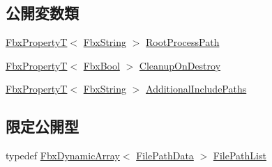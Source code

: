\subsection*{公開変数類}
\begin{DoxyCompactItemize}
\item 
\hyperlink{class_fbx_property_t}{Fbx\+PropertyT}$<$ \hyperlink{class_fbx_string}{Fbx\+String} $>$ \hyperlink{class_fbx_processor_shader_dependency_a2609315b13014fbba8003185c2e8a5f1}{Root\+Process\+Path}
\item 
\hyperlink{class_fbx_property_t}{Fbx\+PropertyT}$<$ \hyperlink{fbxtypes_8h_a92e0562b2fe33e76a242f498b362262e}{Fbx\+Bool} $>$ \hyperlink{class_fbx_processor_shader_dependency_af0bbb628b8b548365fd7d4325f1d4589}{Cleanup\+On\+Destroy}
\item 
\hyperlink{class_fbx_property_t}{Fbx\+PropertyT}$<$ \hyperlink{class_fbx_string}{Fbx\+String} $>$ \hyperlink{class_fbx_processor_shader_dependency_a2ee0459a8761ec48aa6943cc90442b6a}{Additional\+Include\+Paths}
\end{DoxyCompactItemize}
\subsection*{限定公開型}
\begin{DoxyCompactItemize}
\item 
typedef \hyperlink{class_fbx_dynamic_array}{Fbx\+Dynamic\+Array}$<$ \hyperlink{struct_fbx_processor_shader_dependency_1_1_file_path_data}{File\+Path\+Data} $>$ \hyperlink{class_fbx_processor_shader_dependency_a52e467804857e767f194d73000b08f39}{File\+Path\+List}
\end{DoxyCompactItemize}
